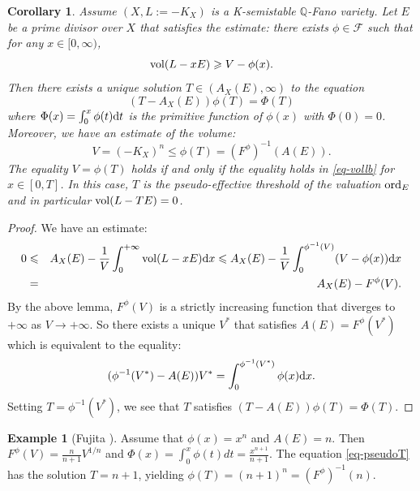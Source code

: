 \documentclass[12pt]{amsart}
\newtheorem{cor}[thm]{Corollary}
\theoremstyle{definition}
\newtheorem{ex}[thm]{Example}
\def\ord{{\rm ord}}
\def\dif{{\rm d}}
\def\vol{{\rm vol}}
\def\ord{{\rm ord}}
\newcommand{\IQ}{{\mathbb Q}}
\newcommand{\lee}{\leqslant}
\newcommand{\gee}{\geqslant}
\begin{document}
\begin{cor}\label{cor-calbd}
    Assume $(X, L:=-K_X)$ is a K-semistable $\IQ$-Fano variety. Let $E$ be a prime divisor over $X$ that satisfies the estimate: there exists $\phi\in \mathscr{F}$ such that for any $x\in [0, \infty)$, 
    \begin{equation}\label{eq-vollb}
        \vol(L-xE)\gee V-\phi(x). 
    \end{equation}
  Then there exists a unique solution $T\in (A_X(E), \infty)$ to the equation 
    \begin{equation}\label{eq-pseudoT}
        (T-A_X(E))\phi(T)=\Phi(T)
    \end{equation} 
    where $\Phi(x)=\int_0^x \phi(t)\dif t$ is the primitive function of $\phi(x)$ with $\Phi(0)=0$. 
    Moreover, we have an estimate of the volume: 
    \begin{equation}\label{eq-volbdT}
        V=(-K_X)^n\lee \phi(T)=(F^{\phi})^{-1}(A(E)).
    \end{equation} 
    The equality $V=\phi(T)$ holds if and only if the equality holds in \eqref{eq-vollb} for $x\in [0, T]$. In this case, $T$ is the pseudo-effective threshold of the valuation $\ord_E$ and in particular $\vol(L-TE)=0$. 
\end{cor}
\begin{proof}
    We have an estimate:
    \begin{eqnarray*}
        0&\lee& A_X(E)-\frac{1}{V}\int_0^{+\infty}\vol(L-xE)\dif x\lee A_X(E)-\frac{1}{V}\int_0^{\phi^{-1}(V)}(V-\phi(x))\dif x\\
        &=&A_X(E)-F^\phi(V).
    \end{eqnarray*}
    By the above lemma, $F^\phi(V)$ is a strictly increasing function that diverges to $+\infty$ as $V\rightarrow+\infty$. So there exists a unique $V^*$ that satisfies $A(E)=F^\phi(V^*)$ which is equivalent to the equality:
    \begin{equation*}
       (\phi^{-1}(V^*)-A(E))V^*=\int_0^{\phi^{-1}(V^*)}\phi(x)\dif x. 
    \end{equation*}
    Setting $T=\phi^{-1}(V^*)$, we see that $T$ satisfies 
    $(T-A(E))\phi(T)=\Phi(T)$. 
 \end{proof}

\begin{ex}[Fujita \cite{Fuj18}]
   Assume that $\phi(x)=x^n$ and $A(E)=n$. Then 
   $F^\phi(V)=\frac{n}{n+1}V^{1/n}$ and $\Phi(x)=\int_0^x\phi(t)dt=\frac{x^{n+1}}{n+1}$. The equation \eqref{eq-pseudoT} has the solution $T=n+1$, yielding $\phi(T)=(n+1)^n=(F^\phi)^{-1}(n)$. 
\end{ex}
\end{document}

